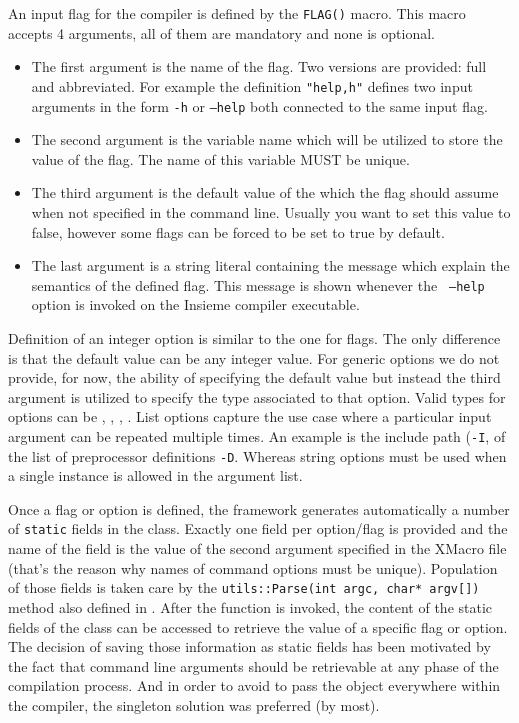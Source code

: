 An input flag for the compiler is defined by the {\tt FLAG()} macro. This macro
accepts 4 arguments, all of them are mandatory and none is optional. 
\begin{itemize}
\item The first argument is the name of the flag. Two versions are provided:
full and abbreviated. For example the definition {\tt "help,h"} defines two
input arguments in the form {\tt -h} or {\tt --help} both connected to the same
input flag.  

\item The second argument is the variable name which will be
utilized to store the value of the flag. The name of this variable MUST be
unique. 

\item The third argument is the default value of the which the flag should
assume when not specified in the command line. Usually you want to set this
value to false, however some flags can be forced to be set to true by default. 

\item The last argument is a string literal containing the message which explain
the semantics of the defined flag. This message is shown whenever the {\tt
--help} option is invoked on the Insieme compiler executable. 
\end{itemize}

Definition of an integer option is similar to the one for flags. The only
difference is that the default value can be any integer value. For generic
options we do not provide, for now, the ability of specifying the default value
but instead the third argument is utilized to specify the type associated to
that option.  Valid types for options can be ,
, , . List
options capture the use case where a particular input argument can be repeated
multiple times. An example is the include path ({\tt -I}, of the list of
preprocessor definitions {\tt -D}.  Whereas string options must be used when a
single instance is allowed in the argument list. 

Once a flag or option is defined, the framework generates automatically a number
of {\tt static} fields in the  class. Exactly
one field per option/flag is provided and the name of the field is the value of
the second argument specified in the XMacro file (that's the reason why names of
command options must be unique). Population of those fields is taken care by the
{\tt utils::Parse(int argc, char* argv[])} method also defined in
. After the  function is invoked,
the content of the static fields of the  class
can be accessed to retrieve the value of a specific flag or option. The decision
of saving those information as static fields has been motivated by the fact that
command line arguments should be retrievable at any phase of the compilation
process. And in order to avoid to pass the 
object everywhere within the compiler, the singleton solution was preferred 
(by most).

